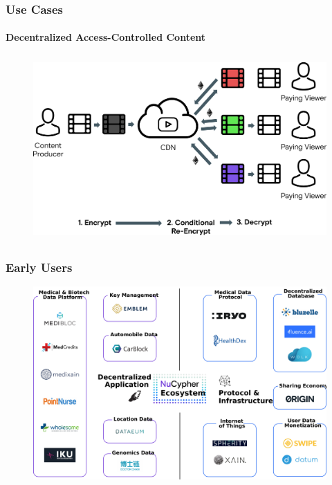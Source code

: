 \documentclass[xetex,mathsans,sans,aspectratio=169]{beamer}
\begin{document}
    \begin{frame}
        \frametitle{Use Cases}
        \framesubtitle{Decentralized Access-Controlled Content}
        \begin{figure}
            \centering
            \includegraphics[height=7cm]{pdf/streams-alternative.pdf}
        \end{figure}
    \end{frame}

    \begin{frame}
      \frametitle{Early Users}
      \begin{figure}
           \includegraphics[width=11.5cm]{pdf/projects.pdf}
      \end{figure}
    \end{frame}
\end{document}
